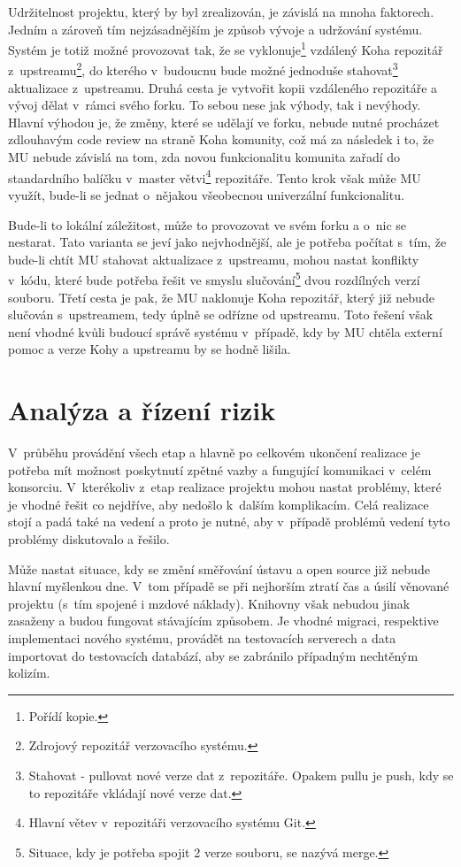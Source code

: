 \documentclass[
	11pt, oneside, printed, final, palatino, monochrome
	microtype,
	table,   %
	lof,     %
	lot     %
]{fithesis3}
\begin{document}
{Udržitelnost projektu, který by byl zrealizován, je závislá na mnoha faktorech. Jedním a zároveň tím nejzásadnějším je způsob vývoje a udržování systému. Systém je totiž možné provozovat tak, že se vyklonuje\footnote{Pořídí kopie.} vzdálený Koha repozitář z~upstreamu\footnote{Zdrojový repozitář verzovacího systému.}, do kterého v~budoucnu bude možné jednoduše stahovat\footnote{Stahovat - pullovat nové verze dat z~repozitáře. Opakem pullu je push, kdy se to repozitáře vkládají nové verze dat.} aktualizace z~upstreamu. Druhá cesta je vytvořit kopii vzdáleného repozitáře a vývoj dělat v~rámci svého forku. To sebou nese jak výhody, tak i nevýhody. Hlavní výhodou je, že změny, které se udělají ve forku, nebude nutné procházet zdlouhavým code review na straně Koha komunity, což má za následek i to, že MU nebude závislá na tom, zda novou funkcionalitu komunita zařadí do standardního balíčku v~master větvi\footnote{Hlavní větev v~repozitáři verzovacího systému Git.} repozitáře. Tento krok však může MU využít, bude-li se jednat o~nějakou všeobecnou univerzální funkcionalitu. 

Bude-li to lokální záležitost, může to provozovat ve svém forku a o~nic se nestarat. Tato varianta se jeví jako nejvhodnější, ale je potřeba počítat s~tím, že bude-li chtít MU stahovat aktualizace z~upstreamu, mohou nastat konflikty v~kódu, které bude potřeba řešit ve smyslu slučování\footnote{Situace, kdy je potřeba spojit 2 verze souboru, se nazývá merge.} dvou rozdílných verzí souboru. Třetí cesta je pak, že MU naklonuje Koha repozitář, který již nebude slučován s~upstreamem, tedy úplně se odřízne od upstreamu. Toto řešení však není vhodné kvůli budoucí správě systému v~případě, kdy by MU chtěla externí pomoc a verze Kohy a upstreamu by se hodně lišila. 

\section{Analýza a řízení rizik}
V~průběhu provádění všech etap a hlavně po celkovém ukončení realizace je potřeba mít možnost poskytnutí zpětné vazby a fungující komunikaci v~celém konsorciu. V~kterékoliv z~etap realizace projektu mohou nastat problémy, které je vhodné řešit co nejdříve, aby nedošlo k~dalším komplikacím. Celá realizace stojí a padá také na vedení a proto je nutné, aby v~případě problémů vedení tyto problémy diskutovalo a řešilo. 

Může nastat situace, kdy se změní směřování ústavu a open source již nebude hlavní myšlenkou dne. V~tom případě se při nejhorším ztratí čas a úsilí věnované projektu (s~tím spojené i mzdové náklady). Knihovny však nebudou jinak zasaženy a budou fungovat stávajícím způsobem. Je vhodné migraci, respektive implementaci nového systému, provádět na testovacích serverech a data importovat do testovacích databází, aby se zabránilo případným nechtěným kolizím.

}
\end{document}
